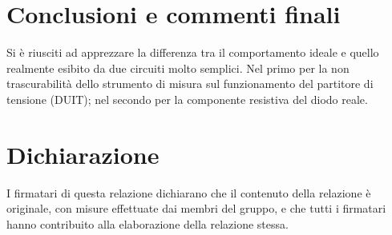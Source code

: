 \documentclass[10pt, a4paper, italian]{article}
\begin{document}
\section{Conclusioni e commenti finali}
Si è riusciti ad apprezzare la differenza tra il comportamento ideale e quello
realmente esibito da due circuiti molto semplici. Nel primo per la non
trascurabilità dello strumento di misura sul funzionamento del partitore di
tensione (DUIT); nel secondo per la componente resistiva del diodo reale.

\section*{Dichiarazione}
I firmatari di questa relazione dichiarano che il contenuto della relazione
\`e originale, con misure effettuate dai membri del gruppo, e che tutti i
firmatari hanno contribuito alla elaborazione della relazione stessa.
\end{document}
